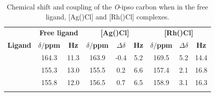 \begin{table}[htbp]
\caption[Chemical shift and coupling of the \emph{O}-ipso carbon when in the free ligand, [Ag(\tBuxantphos)Cl{]} and [Rh(\tBuxantphos)Cl{]} complexes]{Chemical shift and coupling of the \emph{O}-ipso carbon when in the free ligand, [Ag(\tBuxantphos)Cl] and [Rh(\tBuxantphos)Cl] complexes.}
\vspace{1em}
\label{table:oxygenbindingrh}
\small
\begin{center}
\begin{tabular}{ c c c c c c c c c}
	\toprule{}
	~&\multicolumn{2}{c}{\bfseries{Free ligand}} &\multicolumn{3}{c}{\bfseries{[Ag(\tBuxantphos)Cl]}}&\multicolumn{3}{c}{\bfseries{[Rh(\tBuxantphos)Cl]}}\\
	\cmidrule(lr){2-3} \cmidrule(lr){4-6} \cmidrule(lr){7-9}
	\bfseries{Ligand}&\bfseries{$\delta$\carbon{}$/$ppm}&\bfseries{\J{} Hz}&\bfseries{$\delta$\carbon{}$/$ppm}&\bfseries{$\Delta\delta$}&\bfseries{\J{} Hz}&\bfseries{$\delta$\carbon{}$/$ppm}&\bfseries{$\Delta\delta$}&\bfseries{\J{} Hz}\\
	\midrule{}
	\tBusixantphos	&	164.3	& 11.3	&	163.9	& -0.4	& 5.2		& 169.5	& 5.2 	& 14.4 \\
	\tButhixantphos	&	155.3	& 13.0	&	155.5	& 0.2 	& 6.6 	& 157.4	& 2.1 	&16.8 \\
	\tBuxantphos	&	155.8	& 12.0	&	156.5	& 0.7		& 6.5		& 158.9	& 3.1		& 16.3 \\
	\bottomrule{}
\end{tabular}
\end{center}
\end{table}


